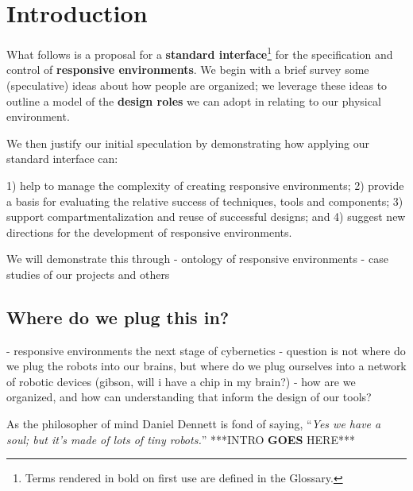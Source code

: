 \section{Introduction}
%
What follows is a proposal for a {\bf standard interface}\footnote{Terms rendered in bold on first use are defined in the Glossary.} for the specification and control of {\bf responsive environments}. We begin with a brief survey some (speculative) ideas about how people are organized; we leverage these ideas to outline a model of the {\bf design roles} we can adopt in relating to our physical environment. 

We then justify our initial speculation by demonstrating how applying our standard interface can:

1) help to manage the complexity of creating responsive environments;
2) provide a basis for evaluating the relative success of techniques, tools and components;
3) support compartmentalization and reuse of successful designs; and
4) suggest new directions for the development of responsive environments.

We will demonstrate this through
- ontology of responsive environments
- case studies of our projects and others

\subsection{Where do we plug this in?}
%
- responsive environments the next stage of cybernetics
- question is not where do we plug the robots into our brains, but where do we plug ourselves into a network of robotic devices (gibson, will i have a chip in my brain?)
- how are we organized, and how can understanding that inform the design of our tools?

As the philosopher of mind Daniel Dennett is fond of saying, ``\emph{Yes we have a soul; but it's made of lots of tiny robots.}'' \citeyearpar[p. 1]{freedom_evolves}
% 
***INTRO {\bf GOES} HERE*** \citep{society_of_mind}


